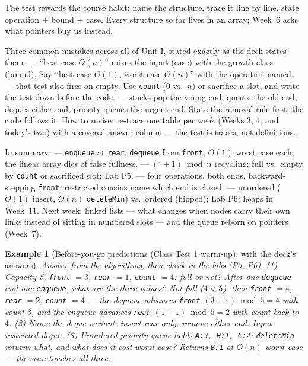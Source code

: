 \documentclass[11pt]{article}
\newtheorem{example}{Example}[section]
\begin{document}
The test rewards the course habit: name the structure, trace it line by line, state operation $+$ bound $+$ case. Every structure so far lives in an array; Week~6 asks what pointers buy us instead.

Three common mistakes across all of Unit I, stated exactly as the deck states them.  --- ``best case $O(n)$'' mixes the input (case) with the growth class (bound). Say ``best case $\Theta(1)$, worst case $\Theta(n)$'' with the operation named.  --- that test also fires on empty. Use \texttt{count} ($0$ vs.\ $n$) or sacrifice a slot, and write the test down before the code.  --- stacks pop the young end, queues the old end, deques either end, priority queues the urgent end. State the removal rule first; the code follows it. How to revise: re-trace one table per week (Weeks 3, 4, and today's two) with a covered answer column --- the test is traces, not definitions.

In summary:  --- \texttt{enqueue} at \texttt{rear}, \texttt{dequeue} from \texttt{front}; $O(1)$ worst case each; the linear array dies of false fullness.  --- $(\cdot + 1) \bmod n$ recycling; full vs.\ empty by \texttt{count} or sacrificed slot; Lab P5.  --- four operations, both ends, backward-stepping \texttt{front}; restricted cousins name which end is closed.  --- unordered ($O(1)$ insert, $O(n)$ \texttt{deleteMin}) vs.\ ordered (flipped); Lab P6; heaps in Week~11. Next week: linked lists --- what changes when nodes carry their own links instead of sitting in numbered slots --- and the queue reborn on pointers (Week~7).

\begin{example}[Before-you-go predictions (Class Test 1 warm-up), with the deck's answers]
Answer from the algorithms, then check in the labs (P5, P6). (1) Capacity 5, \texttt{front} $= 3$, \texttt{rear} $= 1$, \texttt{count} $= 4$: full or not? After one \texttt{dequeue} and one \texttt{enqueue}, what are the three values? Not full ($4 < 5$); then \texttt{front} $= 4$, \texttt{rear} $= 2$, \texttt{count} $= 4$ --- the dequeue advances \texttt{front} $(3+1) \bmod 5 = 4$ with count $3$, and the enqueue advances \texttt{rear} $(1+1) \bmod 5 = 2$ with count back to $4$. (2) Name the deque variant: insert rear-only, remove either end. Input-restricted deque. (3) Unordered priority queue holds \texttt{A:3, B:1, C:2}: \texttt{deleteMin} returns what, and what does it cost worst case? Returns \texttt{B:1} at $O(n)$ worst case --- the scan touches all three.
\end{example}
\end{document}
